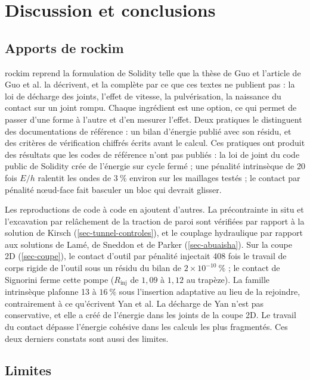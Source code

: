 \section{Discussion et conclusions}
\label{sec-discussion}

\subsection{Apports de rockim}

rockim reprend la formulation de Solidity telle que la thèse de Guo et l'article de Guo et al. la décrivent, et la complète par ce que ces textes ne publient pas : la loi de décharge des joints, l'effet de vitesse, la pulvérisation, la naissance du contact sur un joint rompu. Chaque ingrédient est une option, ce qui permet de passer d'une forme à l'autre et d'en mesurer l'effet. Deux pratiques le distinguent des documentations de référence : un bilan d'énergie publié avec son résidu, et des critères de vérification chiffrés écrits avant le calcul. Ces pratiques ont produit des résultats que les codes de référence n'ont pas publiés : la loi de joint du code public de Solidity crée de l'énergie sur cycle fermé ; une pénalité intrinsèque de 20 fois $E/h$ ralentit les ondes de $3~\%$ environ sur les maillages testés ; le contact par pénalité nœud-face fait basculer un bloc qui devrait glisser.

Les reproductions de code à code en ajoutent d'autres. La précontrainte in situ et l'excavation par relâchement de la traction de paroi sont vérifiées par rapport à la solution de Kirsch (\cref{sec-tunnel-controles}), et le couplage hydraulique par rapport aux solutions de Lamé, de Sneddon et de Parker (\cref{sec-abuaisha}). Sur la coupe 2D (\cref{sec-coupe}), le contact d'outil par pénalité injectait 408 fois le travail de corps rigide de l'outil sous un résidu du bilan de $2\times10^{-10}~\%$ ; le contact de Signorini ferme cette pompe ($R_\text{inj}$ de $1{,}09$ à $1{,}12$ au trapèze). La famille intrinsèque plafonne 13 à $16~\%$ sous l'insertion adaptative au lieu de la rejoindre, contrairement à ce qu'écrivent Yan et al. La décharge  de Yan n'est pas conservative, et elle a créé de l'énergie dans les joints de la coupe 2D. Le travail du contact dépasse l'énergie cohésive dans les calculs les plus fragmentés. Ces deux derniers constats sont aussi des limites.

\subsection{Limites}


